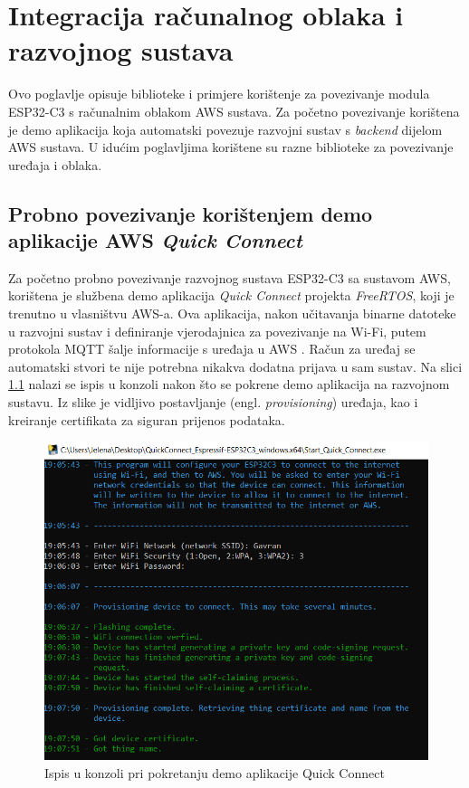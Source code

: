 \chapter{Integracija računalnog oblaka i razvojnog sustava}

Ovo poglavlje opisuje biblioteke i primjere korištenje za povezivanje modula ESP32-C3 s računalnim oblakom AWS sustava. Za početno povezivanje korištena je demo aplikacija koja automatski povezuje razvojni sustav s \textit{backend} dijelom AWS sustava. U idućim poglavljima korištene su razne biblioteke za povezivanje uređaja i oblaka.

\section{Probno povezivanje korištenjem demo aplikacije AWS \textit{Quick Connect}}

Za početno probno povezivanje razvojnog sustava ESP32-C3 sa sustavom AWS, korištena je službena demo aplikacija \textit{Quick Connect} projekta \textit{FreeRTOS}, koji je trenutno u vlasništvu AWS-a. Ova aplikacija, nakon učitavanja binarne datoteke u razvojni sustav i definiranje vjerodajnica za povezivanje na Wi-Fi, putem protokola MQTT šalje informacije s uređaja u AWS \cite{quick_connect_app}. Račun za uređaj se automatski stvori te nije potrebna nikakva dodatna prijava u sam sustav. Na slici \ref{fig:aws_esp32_easy_connect} nalazi se ispis u konzoli nakon što se pokrene demo aplikacija na razvojnom sustavu. Iz slike je vidljivo postavljanje (engl. \textit{provisioning}) uređaja, kao i kreiranje certifikata za siguran prijenos podataka.

\begin{figure}[ht]
	\centering
	\includegraphics[scale=0.6]{imgs/aws_esp32_easy_connect}
	\caption{Ispis u konzoli pri pokretanju demo aplikacije Quick Connect}
	\label{fig:aws_esp32_easy_connect}
\end{figure}

